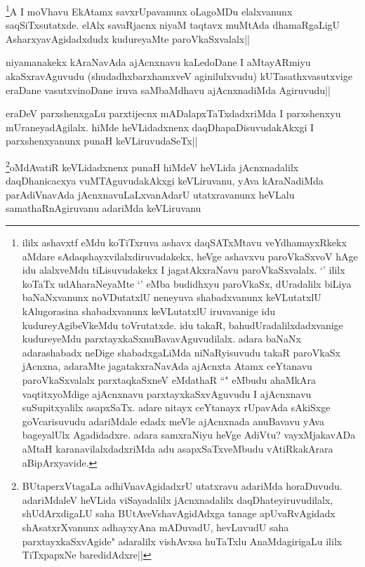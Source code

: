 \begin{artha}
\footnote[1]{ililx ashavxtf eMdu koTiTxruva ashavx daqSATxMtavu veYdhamayxRkekx aMdare sAdaqshayxvilalxdiruvudakekx, heVge ashavxvu paroVkaSxvoV hAge idu alalxveMdu tiLisuvudakekx I jagatAkxraNavu paroVkaSxvalalx. `\stext ' ililx koTaTx udAharaNeyaMte `\stext ' eMba budidhxyu paroVkaSx, dUradalilx biLiya baNaNxvanunx noVDutatxlU neneyuva shabadxvanunx keVLutatxlU kAlugorasina shabadxvanunx keVLutatxlU iruvavanige idu kudureyAgibeVkeMdu toVrutatxde. idu takaR, bahudUradalilxdadxvanige kudureyeMdu parxtayxkaSxnuBavavAguvudilalx. adara baNaNx adarashabadx neDige shabadxgaLiMda niNaRyisuvudu takaR paroVkaSx jAcnxna, adaraMte jagatakxraNavAda ajAcnxta Atamx ceYtanavu paroVkaSxvalalx parxtaqkaSxneV eMdathaR ``\stext " eMbudu ahaMkAra vaqtitxyoMdige ajAcnxnavu parxtayxkaSxvAguvudu I ajAcnxnavu suSupitxyalilx asapxSaTx. adare nitayx ceYtanayx rUpavAda sAkiSxge goVcarisuvudu adariMdale edadx meVle \stext ajAcnxnada anuBavavu yAva bageyalUlx Agadidadxre. adara samxraNiyu heVge AdiVtu? vayxMjakavADa aMtaH karanavilalxdadxriMda adu asapxSaTxveMbudu vAtiRkakArara aBipArxyavide.}A I moVhavu EkAtamx savxrUpavanunx oLagoMDu elalxvanunx saqSiTxsutatxde. elAlx savaRjacnx niyaM taqtavx muMtAda dhamaRgaLigU AsharxyavAgidadxdudx kudureyaMte paroVkaSxvalalx||
\end{artha}

\begin{artha}%
niyamanakekx kAraNavAda ajAcnxnavu kaLedoDane I aMtayARmiyu akaSxravAguvudu (shudadhxbarxhamxveV aginilulxvudu) kUTasathxvasutxvige eraDane vasutxvinoDane iruva saMbaMdhavu ajAcnxnadiMda Agiruvudu||
\end{artha}


\begin{artha}
eraDeV parxshenxgaLu parxtijecnx mADalapxTaTxdadxriMda I parxshenxyu mUraneyadAgilalx. hiMde heVLidadxnenx daqDhapaDisuvudakAkxgi I parxshenxyanunx punaH keVLiruvudaSeTx||
\end{artha}
\begin{artha}
\footnote[1]{BUtaperxVtagaLa adhiVnavAgidadxrU utatxravu adariMda horaDuvudu. adariMdaleV heVLida viSayadalilx jAcnxnadalilx daqDhateyiruvudilalx, shUdArxdigaLU saha BUtAveVshavAgidAdxga tanage apUvaRvAgidadx shAsatxrXvanunx adhayxyAna mADuvadU, hevLuvudU saha parxtayxkaSxvAgide" adaralilx vishAvxsa huTaTxlu AnaMdagirigaLu ililx TiTxpapxNe baredidAdxre||}oMdAvatiR keVLidadxnenx punaH hiMdeV heVLida jAcnxnadalilx daqDhanicacxya vuMTAguvudakAkxgi keVLiruvanu, yAva kAraNadiMda parAdiVnavAda jAcnxnavuLaLxvanAdarU utatxravanunx heVLalu samathaRnAgiruvanu adariMda keVLiruvanu
\end{artha}

